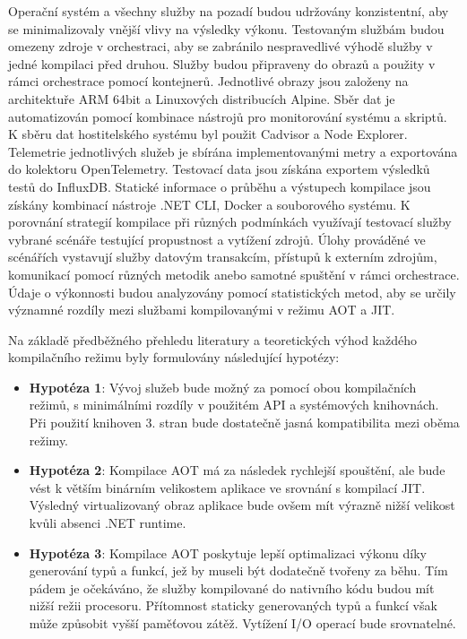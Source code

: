 Operační systém a všechny služby na pozadí budou udržovány konzistentní, aby se minimalizovaly vnější vlivy na výsledky výkonu. Testovaným službám budou omezeny zdroje v orchestraci, aby se zabránilo nespravedlivé výhodě služby v jedné kompilaci před druhou. Služby budou připraveny do obrazů a použity v rámci orchestrace pomocí kontejnerů. Jednotlivé obrazy jsou založeny na architektuře ARM 64bit a Linuxových distribucích Alpine. Sběr dat je automatizován pomocí kombinace nástrojů pro monitorování systému a skriptů. K sběru dat hostitelského systému byl použit Cadvisor a Node Explorer. Telemetrie jednotlivých služeb je sbírána implementovanými metry a exportována do kolektoru OpenTelemetry. Testovací data jsou získána exportem výsledků testů do InfluxDB. Statické informace o průběhu a výstupech kompilace jsou získány kombinací nástroje .NET CLI, Docker a souborového systému. K porovnání strategií kompilace při různých podmínkách využívají testovací služby vybrané scénáře testující propustnost a vytížení zdrojů. Úlohy prováděné ve scénářích vystavují služby datovým transakcím, přístupů k externím zdrojům, komunikací pomocí různých metodik anebo samotné spuštění v rámci orchestrace. Údaje o výkonnosti budou analyzovány pomocí statistických metod, aby se určily významné rozdíly mezi službami kompilovanými v režimu AOT a JIT. 

Na základě předběžného přehledu literatury a teoretických výhod každého kompilačního režimu byly formulovány následující hypotézy:

\begin{itemize}
    \item \textbf{Hypotéza 1}: Vývoj služeb bude možný za pomocí obou kompilačních režimů, s minimálními rozdíly v použitém API a systémových knihovnách. Při použití knihoven 3. stran bude dostatečně jasná kompatibilita mezi oběma režimy.
    \item \textbf{Hypotéza 2}: Kompilace AOT má za následek rychlejší spouštění, ale bude vést k větším binárním velikostem aplikace ve srovnání s kompilací JIT. Výsledný virtualizovaný obraz aplikace bude ovšem mít výrazně nižší velikost kvůli absenci .NET runtime.
    \item \textbf{Hypotéza 3}: Kompilace AOT poskytuje lepší optimalizaci výkonu díky generování typů a funkcí, jež by museli být dodatečně tvořeny za běhu. Tím pádem je očekáváno, že služby kompilované do nativního kódu budou mít nižší režii procesoru. Přítomnost staticky generovaných typů a funkcí však může způsobit vyšší paměťovou zátěž. Vytížení I/O operací bude srovnatelné.
\end{itemize}

